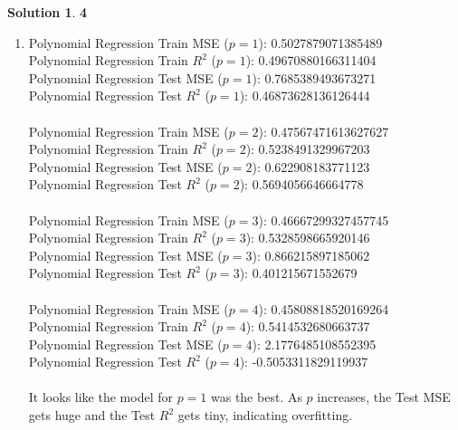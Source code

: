 \documentclass[11pt]{article}
\theoremstyle{definition}
\theoremstyle{nopunct}
\newtheorem*{s}{Solution}
\begin{document}
\begin{s}\textbf{4}
    \begin{enumerate} 
        \item
            Polynomial Regression Train MSE ($p = 1$): 0.5027879071385489 \\
            Polynomial Regression Train $R^2$ ($p = 1$): 0.49670880166311404 \\
            Polynomial Regression Test MSE ($p = 1$): 0.7685389493673271 \\
            Polynomial Regression Test $R^2$ ($p = 1$): 0.46873628136126444 \\
            \bigskip\\
            Polynomial Regression Train MSE ($p = 2$): 0.47567471613627627 \\
            Polynomial Regression Train $R^2$ ($p = 2$): 0.5238491329967203 \\
            Polynomial Regression Test MSE ($p = 2$): 0.622908183771123 \\
            Polynomial Regression Test $R^2$ ($p = 2$): 0.5694056646664778 \\
            \bigskip\\
            Polynomial Regression Train MSE ($p = 3$): 0.46667299327457745 \\
            Polynomial Regression Train $R^2$ ($p = 3$): 0.5328598665920146 \\
            Polynomial Regression Test MSE ($p = 3$): 0.866215897185062 \\
            Polynomial Regression Test $R^2$ ($p = 3$): 0.401215671552679 \\
            \bigskip\\
            Polynomial Regression Train MSE ($p = 4$): 0.45808818520169264 \\
            Polynomial Regression Train $R^2$ ($p = 4$): 0.5414532680663737 \\
            Polynomial Regression Test MSE ($p = 4$): 2.1776485108552395 \\
            Polynomial Regression Test $R^2$ ($p = 4$): -0.5053311829119937 \\
            \bigskip\\
            It looks like the model for $p = 1$ was the best. As $p$ increases,
            the Test MSE gets huge and the Test $R^2$ gets tiny,
            indicating overfitting. 
    \end{enumerate}
\end{s}
\end{document}

